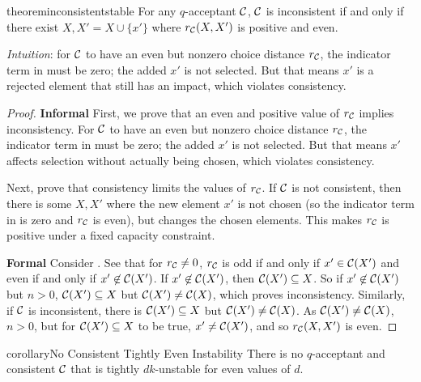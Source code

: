 \begin{restatable}{theorem}{inconsistentstable}
\label{thm:even-inconsistency}
For any $q$-acceptant $\mathcal{C}$, $\mathcal{C}$ is inconsistent if and only if there exist $X, X' = X \cup \{x'\}$ where $r_{\mathcal{C}}(X, X')$ is positive and even.
\end{restatable}

\textit{Intuition}: for $\mathcal{C}$ to have an even but nonzero choice distance $r_{\mathcal{C}}$, the indicator term in   must be zero; the added $x'$ is not selected. But that means $x'$ is a rejected element that still has an impact, which violates consistency.
\begin{proof}
\textbf{Informal}
First, we prove that an even and positive value of $r_{\mathcal{C}}$ implies inconsistency. For $\mathcal{C}$ to have an even but nonzero choice distance $r_{\mathcal{C}}$, the indicator term in   must be zero; the added $x'$ is not selected. But that means $x'$ affects selection without actually being chosen, which violates consistency.

Next, prove that consistency limits the values of $r_{\mathcal{C}}$. If $\mathcal{C}$ is not consistent, then there is some $X, X'$ where the new element $x'$ is not chosen (so the indicator term in  is zero and $r_{\mathcal{C}}$ is even), but changes the chosen elements. This makes  $r_{\mathcal{C}}$ is positive under a fixed capacity constraint.

\textbf{Formal}
Consider . See that for $r_{\mathcal{C}} \neq 0$, $r_{\mathcal{C}}$ is odd if and only if $x' \in \mathcal{C}(X')$ and even if and only if $x' \not\in \mathcal{C}(X')$. If $x' \not\in \mathcal{C}(X')$, then $\mathcal{C}(X') \subseteq X$. %
So if $x' \not\in \mathcal{C}(X')$ but $n > 0$, $\mathcal{C}(X') \subseteq X$ but $\mathcal{C}(X') \neq \mathcal{C}(X)$, which proves inconsistency.
Similarly, if $\mathcal{C}$ is inconsistent, there is $\mathcal{C}(X') \subseteq X$ but $\mathcal{C}(X') \neq \mathcal{C}(X)$. %
As $\mathcal{C}(X') \neq \mathcal{C}(X)$, $n > 0$, but for $\mathcal{C}(X') \subseteq X$ to be true, $x' \neq \mathcal{C}(X')$, and so $r_{\mathcal{C}}(X, X')$ is even.
\end{proof}

\begin{restatable}{corollary}{No Consistent Tightly Even Instability}
\label{cor:even-inconsistency}
There is no $q$-acceptant and consistent $\mathcal{C}$ that is tightly $dk$-unstable for even values of $d$.
\end{restatable}

